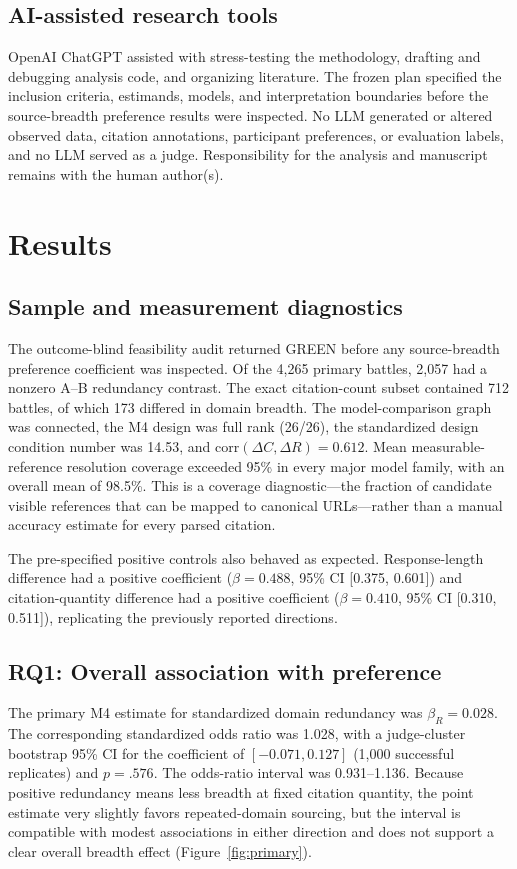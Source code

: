 \documentclass[sigconf,natbib=true,anonymous=true]{acmart}
\begin{document}
\subsection{AI-assisted research tools}
OpenAI ChatGPT assisted with stress-testing the methodology, drafting and debugging analysis code, and organizing literature. The frozen plan specified the inclusion criteria, estimands, models, and interpretation boundaries before the source-breadth preference results were inspected. No LLM generated or altered observed data, citation annotations, participant preferences, or evaluation labels, and no LLM served as a judge. Responsibility for the analysis and manuscript remains with the human author(s).

\section{Results}
\subsection{Sample and measurement diagnostics}
The outcome-blind feasibility audit returned GREEN before any source-breadth preference coefficient was inspected. Of the 4,265 primary battles, 2,057 had a nonzero A--B redundancy contrast. The exact citation-count subset contained 712 battles, of which 173 differed in domain breadth. The model-comparison graph was connected, the M4 design was full rank (26/26), the standardized design condition number was 14.53, and $\mathrm{corr}(\Delta C,\Delta R)=0.612$. Mean measurable-reference resolution coverage exceeded 95\% in every major model family, with an overall mean of 98.5\%. This is a coverage diagnostic---the fraction of candidate visible references that can be mapped to canonical URLs---rather than a manual accuracy estimate for every parsed citation.

The pre-specified positive controls also behaved as expected. Response-length difference had a positive coefficient ($\beta=0.488$, 95\% CI [0.375, 0.601]) and citation-quantity difference had a positive coefficient ($\beta=0.410$, 95\% CI [0.310, 0.511]), replicating the previously reported directions.

\subsection{RQ1: Overall association with preference}
The primary M4 estimate for standardized domain redundancy was $\beta_R=0.028$. The corresponding standardized odds ratio was 1.028, with a judge-cluster bootstrap 95\% CI for the coefficient of $[-0.071,0.127]$ (1,000 successful replicates) and $p=.576$. The odds-ratio interval was 0.931--1.136. Because positive redundancy means less breadth at fixed citation quantity, the point estimate very slightly favors repeated-domain sourcing, but the interval is compatible with modest associations in either direction and does not support a clear overall breadth effect (Figure~\ref{fig:primary}).
\end{document}
